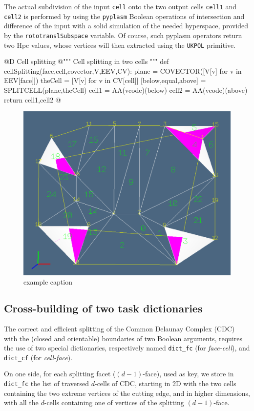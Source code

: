 \documentclass[11pt,oneside]{article}	%
\begin{document}
The actual subdivision of the input \texttt{cell} onto the two output cells \texttt{cell1} and \texttt{cell2} is performed by using the \texttt{pyplasm} Boolean operations of intersection and difference of the input with a solid simulation of the needed hyperspace, provided by the \texttt{rototranslSubspace} variable. Of course, such pyplasm operators return two Hpc values, whose vertices will then extracted using the \texttt{UKPOL} primitive.

@D Cell splitting
@{""" Cell splitting in two cells """
def cellSplitting(face,cell,covector,V,EEV,CV):
	plane = COVECTOR([V[v] for v in EEV[face]])
	theCell = [V[v] for v in CV[cell]]
	[below,equal,above] = SPLITCELL(plane,theCell)
	cell1 = AA(vcode)(below)
	cell2 = AA(vcode)(above)
	return cell1,cell2
@}

\begin{figure}[htbp] %
   \centering
   \includegraphics[width=0.6\linewidth]{images/seeds} 
   \caption{example caption}
   \label{fig:example}
\end{figure}


\subsection{Cross-building of two task dictionaries}

The correct and efficient splitting of the Common Delaunay Complex (CDC) with the  (closed and orientable) boundaries of two Boolean arguments, requires the use of two special dictionaries, respectively named \texttt{dict\_fc} (for \emph{face-cell}), and \texttt{dict\_cf} (for \emph{cell-face}).
 
On one side, for each splitting facet ($(d-1)$-face), used as key, we store in \texttt{dict\_fc} the list of traversed $d$-cells of CDC, starting in 2D with the two cells containing the two extreme vertices of the cutting edge, and in higher dimensions, with all the $d$-cells containing one of vertices of the splitting $(d-1)$-face.
\end{document}
